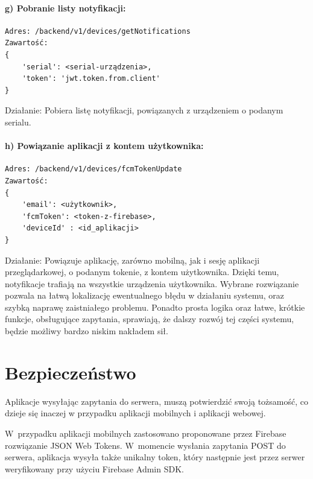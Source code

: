 \paragraph{g) Pobranie listy notyfikacji:}
\begin{verbatim}
Adres: /backend/v1/devices/getNotifications
Zawartość: 
{
	'serial': <serial-urządzenia>,  
	'token': 'jwt.token.from.client'
}
\end{verbatim}
Działanie: Pobiera listę notyfikacji, powiązanych z urządzeniem o podanym serialu.
\paragraph{h) Powiązanie aplikacji z kontem użytkownika:}
\begin{verbatim}
Adres: /backend/v1/devices/fcmTokenUpdate
Zawartość: 
{
	'email': <użytkownik>, 
	'fcmToken': <token-z-firebase>, 
	'deviceId' : <id_aplikacji>
}
\end{verbatim}
Działanie: Powiązuje aplikację, zarówno mobilną, jak i sesję aplikacji przeglądarkowej, o podanym tokenie, z kontem użytkownika. Dzięki temu, notyfikacje trafiają na wszystkie urządzenia użytkownika.
\newline
\newline
Wybrane rozwiązanie pozwala na łatwą lokalizację ewentualnego błędu w działaniu systemu, oraz szybką naprawę zaistniałego problemu. Ponadto prosta logika oraz łatwe, krótkie funkcje, obsługujące zapytania, sprawiają, że dalszy rozwój tej części systemu, będzie możliwy bardzo niskim nakładem sił. 

\section{Bezpieczeństwo}

Aplikacje wysyłając zapytania do serwera, muszą potwierdzić swoją tożsamość, co dzieje się inaczej w przypadku aplikacji mobilnych i aplikacji webowej.

W~przypadku aplikacji mobilnych zastosowano proponowane przez Firebase rozwiązanie JSON Web Tokens. W~momencie wysłania zapytania POST do serwera, aplikacja wysyła także unikalny token, który następnie jest przez serwer weryfikowany przy użyciu Firebase Admin SDK.


